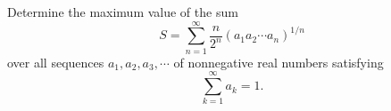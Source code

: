 Determine the maximum value of the sum
\[
S = \sum_{n=1}^\infty \frac{n}{2^n} (a_1 a_2 \cdots a_n)^{1/n}
\]
over all sequences $a_1, a_2, a_3, \cdots$ of nonnegative real numbers satisfying
\[
\sum_{k=1}^\infty a_k = 1.
\]
